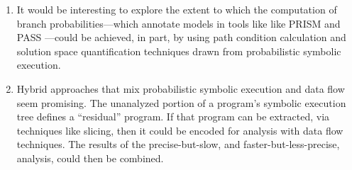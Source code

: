 \begin{enumerate}
\item It would be interesting to explore the extent
to which the computation of branch probabilities---which annotate
models in tools like like PRISM \cite{kwiatkowska2011prism} and 
PASS \cite{hahn2010pass}---could be achieved,
in part, by using path condition calculation and solution
space quantification techniques drawn from probabilistic symbolic
execution.  

\item Hybrid approaches that mix probabilistic symbolic execution
and data flow seem promising.  The unanalyzed portion of a program's
symbolic execution tree defines a ``residual'' program.  If that
program can be extracted, via techniques like slicing, then it
could be encoded for analysis with data flow techniques.  The
results of the precise-but-slow, and faster-but-less-precise,
analysis, could then be combined. 

\end{enumerate}
